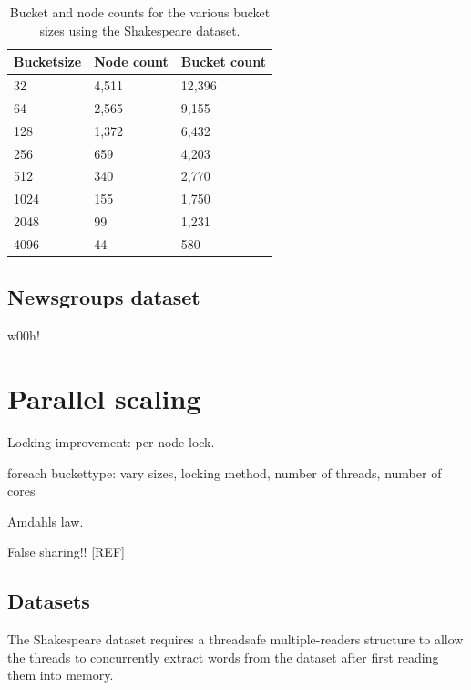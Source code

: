 \begin{table}[h]
    \centering
    \begin{tabular}[here]{ l l l }
        \hline
        Bucketsize&  Node count & Bucket count\\\hline
        32        &  4,511      & 12,396      \\
        64        &  2,565      & 9,155       \\ 
        128       &  1,372      & 6,432       \\ 
        256       &  659        & 4,203       \\ 
        512       &  340        & 2,770       \\ 
        1024      &  155        & 1,750       \\ 
        2048      &  99         & 1,231       \\ 
        4096      &  44         & 580         \\ \hline
    \end{tabular}
    \caption{Bucket and node counts for the various bucket sizes using the Shakespeare
        dataset.}
    \label{tab:bncounts_shakespeare}
\end{table}

\subsection{Newsgroups dataset}
w00h!



\section{Parallel scaling}

Locking improvement: per-node lock.

foreach buckettype: vary sizes, locking method,
                    number of threads, number of cores

Amdahls law.

False sharing!! [REF] 


\subsection{Datasets}
The Shakespeare dataset requires a threadsafe multiple-readers structure to
allow the threads to concurrently extract words from the dataset after first
reading them into memory.

